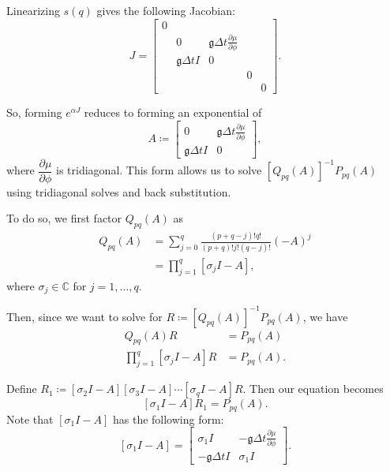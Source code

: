 \documentclass{csri19}
\newcommand{\CFKg}{\mathfrak{g}}
\begin{document}
Linearizing $s(q)$ gives the following Jacobian:
\[ J = \begin{bmatrix}
0&                  &                                                   &  & \\
 & 0                & \CFKg \Delta t \frac{\partial \mu}{\partial \phi} &  & \\
 & \CFKg \Delta t I & 0                                                 &  & \\
 &                  &                                                   &0 & \\
 &                  &                                                   &  &0\end{bmatrix}.\]

So, forming $e^{\alpha J}$ reduces to forming an exponential of 
\[A \coloneqq \begin{bmatrix}
   0              & \CFKg \Delta t \frac{\partial \mu}{\partial \phi} \\
 \CFKg \Delta t I & 0  \end{bmatrix},\]
where $\dfrac{\partial \mu}{\partial \phi}$ is tridiagonal. This form 
allows us to solve $\left[Q_{pq}(A)\right]^{-1}P_{pq}(A)$ using 
tridiagonal solves and back substitution.

To do so, we first factor $Q_{pq}(A)$ as
\begin{align*}
Q_{pq}(A) &= \sum_{j=0}^q\frac{(p+q-j)!q!}{(p+q)!j!(q-j)!}(-A)^j\\
          &= \prod_{j=1}^q\left[\sigma_jI-A\right],
\end{align*}
where $\sigma_j\in \mathbb{C}$ for $j=1,\dots,q$.

Then, since we want to solve for 
$R \coloneqq \left[Q_{pq}(A)\right]^{-1}P_{pq}(A)$, we have
\begin{align*}
Q_{pq}(A) R &= P_{pq}(A)\\
\prod_{j=1}^q\left[\sigma_jI-A\right]R &= P_{pq}(A).
\end{align*}

Define $R_1 \coloneqq \left[\sigma_2I-A\right]\left[\sigma_3I-A\right]\cdots\left[\sigma_qI-A\right]R$.
Then our equation becomes
\[ \left[\sigma_1I-A\right]R_1 = P_{pq}(A).\] Note that
$\left[\sigma_1I-A\right]$ has the following form:
\[ \left[\sigma_1I-A\right] =
 \begin{bmatrix} \sigma_1 I  & -\CFKg\Delta t \frac{\partial\mu}{\partial\phi} \\
 -\CFKg\Delta t I          & \sigma_1 I \end{bmatrix}.\]
\end{document}
